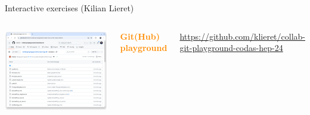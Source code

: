 \documentclass[aspectratio=169]{beamer}
\begin{document}
\begin{frame}{Interactive exercises (Kilian Lieret)}
\vspace{0.25 cm}
\large
\begin{columns}
\includegraphics[width=\linewidth]{PLOTS/github-playground.png}

\textcolor{darkorange}{\bf Git(Hub) playground}

\tiny
\vspace{0.2 cm}
\textcolor{blue}{\href{https://github.com/klieret/collab-git-playground-codas-hep-24}{https://github.com/klieret/collab-git-playground-codas-hep-24}}

\small
\vspace{0.5 cm}

\vspace{0.5 cm}

\vspace{0.5 cm}

\end{columns}
\end{frame}
\end{document}
